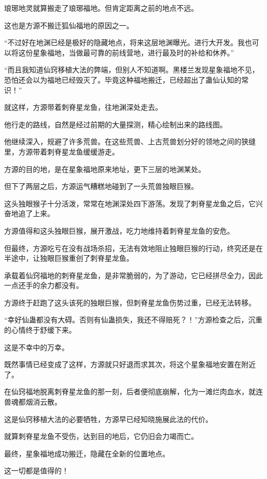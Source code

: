 \begin{this_body}
琅琊地灵就算搬走了琅琊福地。但肯定距离之前的地点不远。

这也是方源不搬迁狐仙福地的原因之一。

“不过好在地渊已经是极好的隐藏地点，将来这层地渊曝光。进行大开发。我也可以将这份星象福地，当做最可靠的前线营地，进行最及时的补给和休养。”

“而且我知道仙窍移植大法的弊端，但别人不知道啊。黑楼兰发现星象福地不见，恐怕还会以为福地已经毁灭了。毕竟这种福地搬迁，已经超出了蛊仙认知的常识！”

就这样，方源带着刺脊星龙鱼，往地渊深处走去。

他行走的路线，自然是经过前期的大量探测，精心绘制出来的路线图。

他继续深入，规避了许多荒兽。在这些荒兽、上古荒兽划分好的领地之间的狭缝里，方源带着刺脊星龙鱼缓缓游走。

方源的目的地，是在星象福地原来地址，更下三层的地渊某处。

但下了两层之后，方源运气糟糕地碰到了一头荒兽独眼巨猴。

这头独眼猴子十分活泼，常常在地渊深处四下游荡。发现了刺脊星龙鱼之后，它兴奋地追了上来。

方源值得和这头独眼巨猴，展开激战，吃力地维持着刺脊星龙鱼的安危。

但最终，方源吃亏在没有战场杀招，无法有效地阻止独眼巨猴的行动，终究还是在半途中，让独眼巨猴重创了刺脊星龙鱼。

承载着仙窍福地的刺脊星龙鱼，是非常脆弱的，为了游动，它已经拼尽全力，因此一点还手的余力都没有。

方源终于赶跑了这头该死的独眼巨猴，但刺脊星龙鱼伤势过重，已经无法转移。

“幸好仙蛊都没有大碍。否则有仙蛊损失，我还不得赔死？！”方源检查之后，沉重的心情终于舒缓下来。

这是不幸中的万幸。

既然事情已经变成了这样，方源就只好退而求其次，将这个星象福地安置在附近了。

在仙窍福地脱离刺脊星龙鱼的那一刻，后者便彻底崩解，化为一滩烂肉血水，就连兽魂都烟消云散。

这是仙窍移植大法的必要牺牲，方源早已经知晓施展此法的代价。

就算刺脊星龙鱼不受伤，达到目的地后，它仍旧会力竭而亡。

最终，星象福地成功搬迁，隐藏在全新的位置地点。

这一切都是值得的！

\end{this_body}

